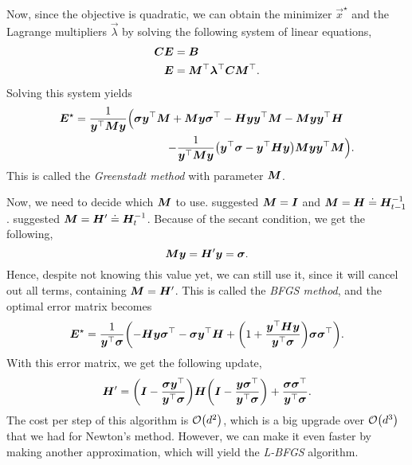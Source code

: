 Now, since the objective is quadratic, we can obtain the minimizer $\vec{x}^\star$ and the Lagrange
multipliers $\vec{\lambda}$ by solving the following system of linear equations,
\begin{align*}
    \bm{C} \bm{E} & = \bm{B}                                                                    \\
    \bm{E}         & = \bm{M}^\top \bm{\lambda}^\top \bm{C} \bm{M}^\top.
\end{align*}
Solving this system yields
\begin{align*}
    \mat{E}^\star = \frac{1}{\transpose{\vec{y}} \mat{M} \vec{y}} \Big( \vec{\sigma} \transpose{\vec{y}} \mat{M} + \mat{M} \vec{y} \transpose{\vec{\sigma}} - \mat{H} \vec{y} \transpose{\vec{y}} \mat{M} - \mat{M} \vec{y} \transpose{\vec{y}} \mat{H} \quad & \\
    - \frac{1}{\transpose{\vec{y}} \mat{M} \vec{y}} \lft( \transpose{\vec{y}} \vec{\sigma} - \transpose{\vec{y}} \mat{H} \vec{y} \rgt) \mat{M} \vec{y} \transpose{\vec{y}} \mat{M} \Big).                                                                     &
\end{align*}
This is called the \textit{Greenstadt method} with parameter $\bm{M}$.

Now, we need to decide which $\bm{M}$ to use. \cite{greenstadt1970variations} suggested $\bm{M} =
    \bm{I}$ and $\bm{M} = \bm{H} \doteq \bm{H}^{-1}_{t-1}$. \cite{goldfarb1970family} suggested
$\bm{M} = \bm{H}' \doteq \bm{H}^{-1}_t$. Because of the secant condition, we get the following, \[
    \bm{M} \bm{y} = \bm{H}' \bm{y} = \bm{\sigma}.
\]
Hence, despite not knowing this value yet, we can still use it, since it will cancel out all terms,
containing $\bm{M} = \bm{H}'$. This is called the \textit{BFGS method}, and the optimal error
matrix becomes \[
    \mat{E}^\star = \frac{1}{\transpose{\vec{y}} \vec{\sigma}} \lft( - \mat{H} \vec{y} \transpose{\vec{\sigma}} - \vec{\sigma} \transpose{\vec{y}} \mat{H} + \lft( 1 + \frac{\transpose{\vec{y}} \mat{H} \vec{y}}{\transpose{\vec{y}} \vec{\sigma}} \rgt) \vec{\sigma} \transpose{\vec{\sigma}} \rgt).
\]
With this error matrix, we get the following update, \[
    \mat{H}' = \lft( \mat{I} - \frac{\vec{\sigma} \transpose{\vec{y}}}{\transpose{\vec{y}}\vec{\sigma}} \rgt) \mat{H} \lft( \mat{I} - \frac{\vec{y} \transpose{\vec{\sigma}}}{\transpose{\vec{y}} \vec{\sigma}} \rgt) + \frac{\vec{\sigma} \transpose{\vec{\sigma}}}{\transpose{\vec{y}} \vec{\sigma}}.
\]
The cost per step of this algorithm is $\bigo{d^2}$, which is a big upgrade over $\bigo{d^3}$ that
we had for Newton's method. However, we can make it even faster by making another approximation,
which will yield the \textit{L-BFGS} algorithm.

